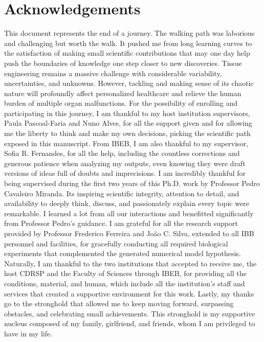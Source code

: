 \documentclass[12pt]{report}
\begin{document}
\section*{Acknowledgements}
{}
This document represents the end of a journey. The walking path was laborious and challenging but worth the walk. It pushed me from long learning curves to the satisfaction of making small scientific contributions that may one day help push the boundaries of knowledge one step closer to new discoveries. Tissue engineering remains a massive challenge with considerable variability, uncertainties, and unknowns. However, tackling and making sense of its chaotic nature will profoundly affect personalized healthcare and relieve the human burden of multiple organ malfunctions. For the possibility of enrolling and participating in this journey, I am thankful to my host institution supervisors, Paula Pascoal-Faria and Nuno Alves, for all the support given and for allowing me the liberty to think and make my own decisions, picking the scientific path exposed in this manuscript. From IBEB, I am also thankful to my supervisor, Sofia R. Fernandes, for all the help, including the countless corrections and generous patience when analyzing my outputs, even knowing they were draft versions of ideas full of doubts and imprecisions. I am incredibly thankful for being supervised during the first two years of this Ph.D. work by Professor Pedro Cavaleiro Miranda. Its inspiring scientific integrity, attention to detail, and availability to deeply think, discuss, and passionately explain every topic were remarkable. I learned a lot from all our interactions and benefitted significantly from Professor Pedro's guidance. I am grateful for all the research support provided by Professor Frederico Ferreira and João C. Silva, extended to all IBB personnel and facilities, for gracefully conducting all required biological experiments that complemented the generated numerical model hypothesis. Naturally, I am thankful to the two institutions that accepted to receive me, the host CDRSP and the Faculty of Sciences through IBEB, for providing all the conditions, material, and human, which include all the institution's staff and services that created a supportive environment for this work. Lastly, my thanks go to the stronghold that allowed me to keep moving forward, surpassing obstacles, and celebrating small achievements. This stronghold is my supportive nucleus composed of my family, girlfriend, and friends, whom I am privileged to have in my life. 
\end{document}
